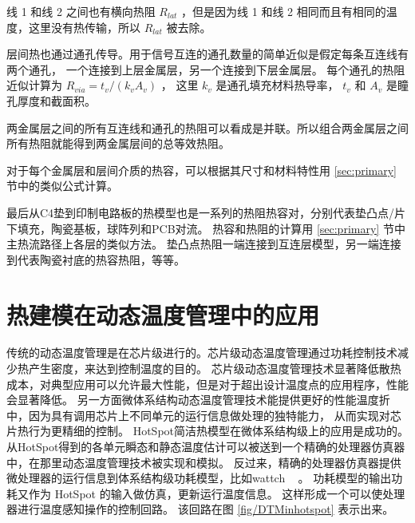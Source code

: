 线 1 和线 2 之间也有横向热阻 $R_{lat}$ ，但是因为线 1 和线 2 相同而且有相同的温度，这里没有热传输，所以 $R_{lat}$ 被去除。

层间热也通过通孔传导。用于信号互连的通孔数量的简单近似是假定每条互连线有两个通孔，
一个连接到上层金属层，另一个连接到下层金属层。
每个通孔的热阻近似计算为 $R_{via} = t_v/(k_vA_v)$ ， 这里 $k_v$ 是通孔填充材料热导率， $t_v$ 和 $A_v$ 是瞳孔厚度和截面积。

两金属层之间的所有互连线和通孔的热阻可以看成是并联。所以组合两金属层之间所有热阻就能得到两金属层间的总等效热阻。

对于每个金属层和层间介质的热容，可以根据其尺寸和材料特性用 \ref{sec:primary} 节中的类似公式计算。

最后从C4垫到印制电路板的热模型也是一系列的热阻热容对，分别代表垫凸点/片下填充，陶瓷基板，球阵列和PCB对流。
热容和热阻的计算用 \ref{sec:primary} 节中主热流路径上各层的类似方法。
垫凸点热阻一端连接到互连层模型，另一端连接到代表陶瓷衬底的热容热阻，等等。

\section{热建模在动态温度管理中的应用}\label{sec:hotspotinDTM}

传统的动态温度管理是在芯片级进行的。芯片级动态温度管理通过功耗控制技术减少热产生密度，来达到控制温度的目的。
芯片级动态温度管理技术显著降低散热成本，对典型应用可以允许最大性能，但是对于超出设计温度点的应用程序，性能会显著降低。
另一方面微体系结构动态温度管理技术能提供更好的性能温度折中，因为具有调用芯片上不同单元的运行信息做处理的独特能力，
从而实现对芯片热行为更精细的控制。
HotSpot简洁热模型在微体系结构级上的应用是成功的。
从HotSpot得到的各单元瞬态和静态温度估计可以被送到一个精确的处理器仿真器中，在那里动态温度管理技术被实现和模拟。
反过来，精确的处理器仿真器提供微处理器的运行信息到体系结构级功耗模型，比如wattch ~\cite{Brooks:ISCA'00} 。
功耗模型的输出功耗又作为 HotSpot 的输入做仿真，更新运行温度信息。
这样形成一个可以使处理器进行温度感知操作的控制回路。
该回路在图 \ref{fig/DTMinhotspot} 表示出来。\\

























